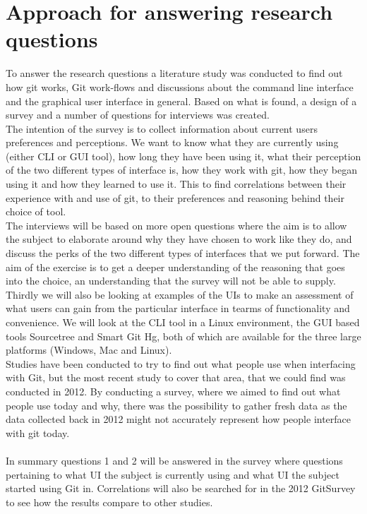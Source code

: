 \documentclass[a4paper,oneside]{bth} %
\begin{document}
			\section{Approach for answering research questions}
			To answer the research questions a literature study was conducted to find out how git works, Git work-flows and discussions about the command line interface and the graphical user interface in general. Based on what is found, a design of a survey and a number of  questions for interviews was created.\\
			The intention of the survey is to collect information about current users preferences and perceptions. We want to know what they are currently using (either CLI or GUI tool), how long they have been using it, what their perception of the two different types of interface is, how they work with git, how they began using it and how they learned to use it. This to find correlations between their experience with and use of git, to their preferences and reasoning behind their choice of tool.\\
			The interviews will be based on more open questions where the aim is to allow the subject to elaborate around why they have chosen to work like they do, and discuss the perks of the two different types of interfaces that we put forward. The aim of the exercise is to get a deeper understanding of the reasoning that goes into the choice, an understanding that the survey will not be able to supply.\\
			Thirdly we will also be looking at examples of the UIs to make an assessment of what users can gain from the particular interface in tearms of functionality and convenience. We will look at the CLI tool in a Linux environment, the GUI based tools Sourcetree and Smart Git Hg, both of which are available for the three large platforms (Windows, Mac and Linux).\\
			Studies have been conducted to try to find out what people use when interfacing with Git, but the most recent study to cover that area, that we could find was conducted in 2012.
			By conducting a survey, where we aimed to find out what people use today and why, there was the possibility to gather fresh data as the data collected back in 2012 might not accurately represent how people interface with git today.
			\\\\
			In summary questions 1 and 2 will be answered in the survey where questions pertaining to what UI the subject is currently using and what UI the subject started using Git in. Correlations will also be searched for in the 2012 GitSurvey \cite{GitUserSurvey} to see how the results compare to other studies.
\end{document}
